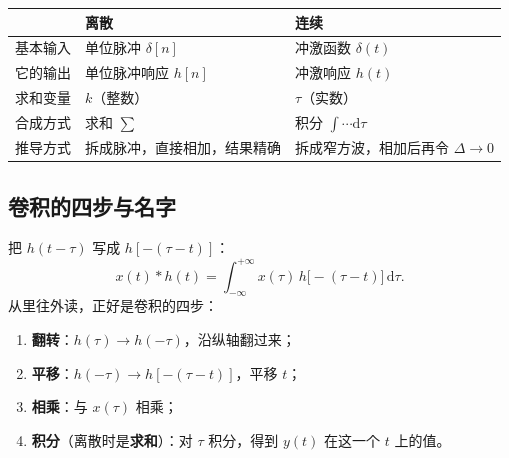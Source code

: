 \documentclass[UTF8,a4paper,11pt]{ctexart}
\newcounter{ex}[section]
\begin{document}
\begin{center}
\begin{tabular}{@{}lll@{}}
\toprule
 & 离散 & 连续\\
\midrule
基本输入 & 单位脉冲 $\delta[n]$ & 冲激函数 $\delta(t)$\\
它的输出 & 单位脉冲响应 $h[n]$ & 冲激响应 $h(t)$\\
求和变量 & $k$（整数） & $\tau$（实数）\\
合成方式 & 求和 $\sum$ & 积分 $\int\cdots\mathrm{d}\tau$\\
推导方式 & 拆成脉冲，直接相加，结果精确 & 拆成窄方波，相加后再令 $\Delta\to0$\\
\bottomrule
\end{tabular}
\end{center}

\subsection{卷积的四步与名字}
把 $h(t-\tau)$ 写成 $h[-(\tau-t)]$：
\[
x(t)\ast h(t)=\int_{-\infty}^{+\infty}x(\tau)\,h\big[-(\tau-t)\big]\,\mathrm{d}\tau .
\]
从里往外读，正好是卷积的四步：
\begin{enumerate}[nosep]
\item \textbf{翻转}：$h(\tau)\to h(-\tau)$，沿纵轴翻过来；
\item \textbf{平移}：$h(-\tau)\to h[-(\tau-t)]$，平移 $t$；
\item \textbf{相乘}：与 $x(\tau)$ 相乘；
\item \textbf{积分}（离散时是\textbf{求和}）：对 $\tau$ 积分，得到 $y(t)$ 在这一个 $t$ 上的值。
\end{enumerate}
\end{document}
